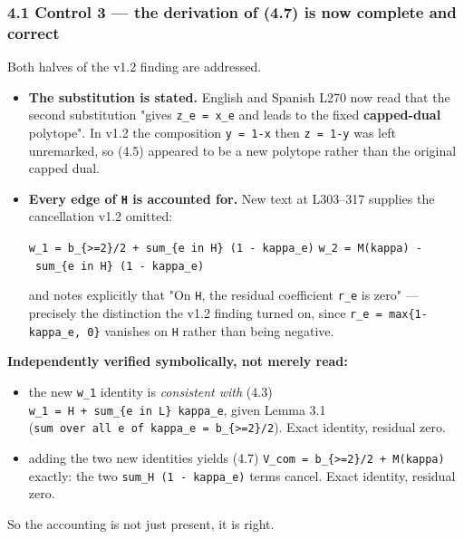 \documentclass[
  9pt,
  a4paper,
]{article}
\providecommand{\tightlist}{%
  \setlength{\itemsep}{0pt}\setlength{\parskip}{0pt}}
\begin{document}
\subsubsection{4.1 Control 3 --- the derivation of (4.7) is now complete
and
correct}\label{41-control-3--the-derivation-of-47-is-now-complete-and-correct}

Both halves of the v1.2 finding are addressed.

\begin{itemize}
\item
  \textbf{The substitution is stated.} English and Spanish L270 now read
  that the second substitution "gives \texttt{z\_e\ =\ x\_e} and leads
  to the fixed \textbf{capped-dual} polytope". In v1.2 the composition
  \texttt{y\ =\ 1-x} then \texttt{z\ =\ 1-y} was left unremarked, so
  (4.5) appeared to be a new polytope rather than the original capped
  dual.
\item
  \textbf{Every edge of \texttt{H} is accounted for.} New text at
  L303--317 supplies the cancellation v1.2 omitted:

  \texttt{\textbar{}w\_1\textbar{}\ =\ b\_\{\textgreater{}=2\}/2\ +\ sum\_\{e\ in\ H\}\ (1\ -\ kappa\_e)}
  \texttt{\textbar{}w\_2\textbar{}\ =\ M(kappa)\ -\ sum\_\{e\ in\ H\}\ (1\ -\ kappa\_e)}

  and notes explicitly that "On \texttt{H}, the residual coefficient
  \texttt{r\_e} is zero" --- precisely the distinction the v1.2 finding
  turned on, since \texttt{r\_e\ =\ max\{1-kappa\_e,\ 0\}} vanishes on
  \texttt{H} rather than being negative.
\end{itemize}

\textbf{Independently verified symbolically, not merely read:}

\begin{itemize}
\tightlist
\item
  the new \texttt{\textbar{}w\_1\textbar{}} identity is \emph{consistent
  with} (4.3)
  \texttt{\textbar{}w\_1\textbar{}\ =\ \textbar{}H\textbar{}\ +\ sum\_\{e\ in\ L\}\ kappa\_e},
  given Lemma 3.1
  (\texttt{sum\ over\ all\ e\ of\ kappa\_e\ =\ b\_\{\textgreater{}=2\}/2}).
  Exact identity, residual zero.
\item
  adding the two new identities yields (4.7)
  \texttt{V\_com\ =\ b\_\{\textgreater{}=2\}/2\ +\ M(kappa)} exactly:
  the two \texttt{sum\_H\ (1\ -\ kappa\_e)} terms cancel. Exact
  identity, residual zero.
\end{itemize}

So the accounting is not just present, it is right.
\end{document}
